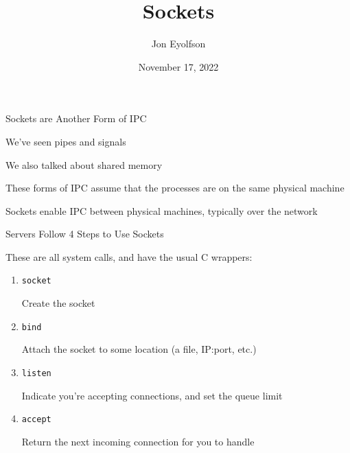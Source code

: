 

\title{Sockets}
\author{Jon Eyolfson}
\date{November 17, 2022}


  \begin{frame}
    \titlepage
  \end{frame}

  \begin{frame}{Sockets are Another Form of IPC}

    We've seen pipes and signals

    \hspace{2em} We also talked about shared memory

    \vspace{2em}

    These forms of IPC assume that the processes are on the same physical
    machine

    \vspace{2em}

    Sockets enable IPC between physical machines, typically over the network
  \end{frame}

  \begin{frame}{Servers Follow 4 Steps to Use Sockets}

    These are all system calls, and have the usual C wrappers:

    \vspace{2em}

    \begin{enumerate}
      \item \texttt{socket}

        \hspace{2em} Create the socket
      \item \texttt{bind}

        \hspace{2em} Attach the socket to some location (a file, IP:port, etc.)
      \item \texttt{listen}

        \hspace{2em} Indicate you're accepting connections, and set the queue limit
      \item \texttt{accept}

        \hspace{2em} Return the next incoming connection for you to handle
    \end{enumerate}
  \end{frame}

